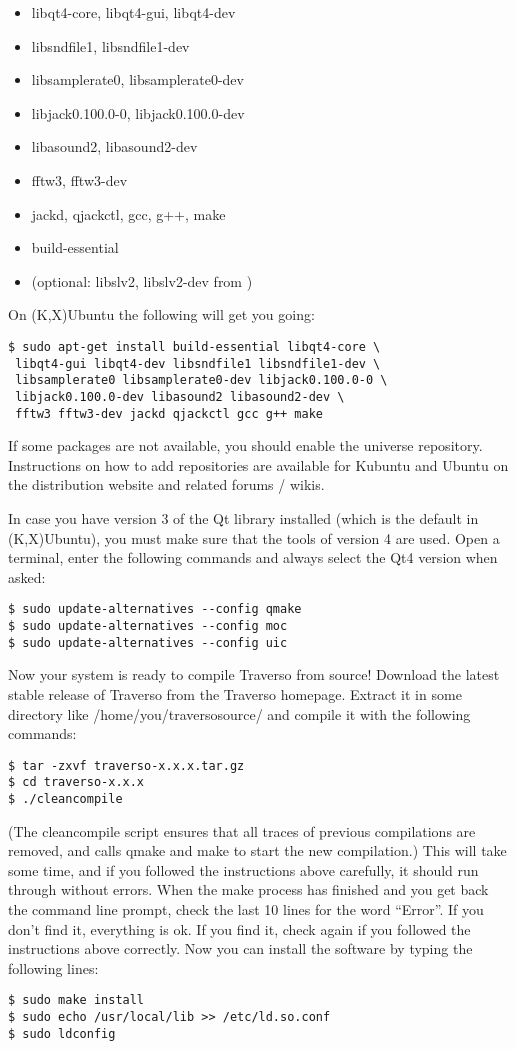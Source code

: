 \begin{itemize}
 \item libqt4-core, libqt4-gui, libqt4-dev
 \item libsndfile1, libsndfile1-dev
 \item libsamplerate0, libsamplerate0-dev
 \item libjack0.100.0-0, libjack0.100.0-dev
 \item libasound2, libasound2-dev
 \item fftw3, fftw3-dev
 \item jackd, qjackctl, gcc, g++, make
 \item build-essential
 \item (optional: libslv2, libslv2-dev from \cite{trav-repo})
\end{itemize}
On (K,X)Ubuntu the following will get you going:
\begin{verbatim}
$ sudo apt-get install build-essential libqt4-core \
 libqt4-gui libqt4-dev libsndfile1 libsndfile1-dev \
 libsamplerate0 libsamplerate0-dev libjack0.100.0-0 \
 libjack0.100.0-dev libasound2 libasound2-dev \
 fftw3 fftw3-dev jackd qjackctl gcc g++ make
\end{verbatim}
If some packages are not available, you should enable the universe repository. Instructions on how to add repositories are available for Kubuntu and Ubuntu on the distribution website and related forums / wikis.

In case you have version 3 of the Qt library installed (which is the default in (K,X)Ubuntu), you must make sure that the tools of version 4 are used. Open a terminal, enter the following commands and always select the Qt4 version when asked:

\begin{verbatim}
$ sudo update-alternatives --config qmake
$ sudo update-alternatives --config moc
$ sudo update-alternatives --config uic
\end{verbatim}

Now your system is ready to compile Traverso from source! Download the latest stable release of Traverso from the Traverso homepage. Extract it in some directory like /home/you/traversosource/ and compile it with the following commands:

\begin{verbatim}
$ tar -zxvf traverso-x.x.x.tar.gz
$ cd traverso-x.x.x
$ ./cleancompile
\end{verbatim}
(The cleancompile script ensures that all traces of previous compilations are removed, and calls qmake and make to start the new compilation.) This will take some time, and if you followed the instructions above carefully, it should run through without errors. When the make process has finished and you get back the  command line prompt, check the last 10 lines for the word ``Error''. If you don't find it, everything is ok. If you find it, check again if you followed the instructions above correctly. Now you can install the software by typing the following lines:

\begin{verbatim}
$ sudo make install
$ sudo echo /usr/local/lib >> /etc/ld.so.conf
$ sudo ldconfig
\end{verbatim}
